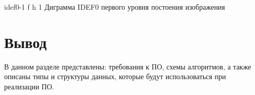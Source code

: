 {idef0-1} %
{f} %
{h} %
{1\textwidth} %
{Диграмма IDEF0 первого уровня постоения изображения} %

\clearpage




\section*{Вывод}
В данном разделе представлены: требования к ПО, схемы алгоритмов, а также описаны типы и структуры данных, которые будут использоваться при реализации ПО.


